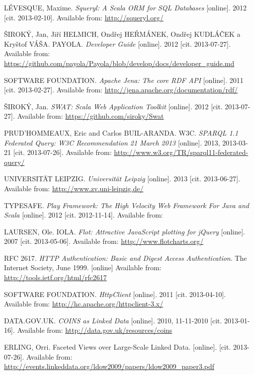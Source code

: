 \begin{thebibliography}{99}
{\sc LÉVESQUE,} Maxime. 
\emph{Squeryl: A Scala ORM for SQL Databases} [online]. 2012 [cit. 2013-02-10].
Available from: \url{http://squeryl.org/}

{\sc ŠIROKÝ,} Jan, Jiří HELMICH, Ondřej HEŘMÁNEK, Ondřej KUDLÁČEK a Kryštof VÁŠA. PAYOLA.
\emph{Developer Guide} [online]. 2012 [cit. 2013-07-27]. 
Available from: \url{https://github.com/payola/Payola/blob/develop/docs/developer_guide.md}

{\scAPACHE SOFTWARE FOUNDATION.} 
\emph{Apache Jena: The core RDF API} [online]. 2011 [cit. 2013-02-27]. 
Available from: \url{http://jena.apache.org/documentation/rdf/}

{\sc ŠIROKÝ,} Jan. 
\emph{SWAT: Scala Web Application Toolkit} [online]. 2012 [cit. 2013-07-27].
Available from: \url{https://github.com/siroky/Swat}

{\sc PRUD'HOMMEAUX,} Eric and Carlos BUIL-ARANDA. W3C.
\emph{SPARQL 1.1 Federated Query: W3C Recommendation 21 March 2013} [online].
2013, 2013-03-21 [cit. 2013-07-26].
Available from: \url{http://www.w3.org/TR/sparql11-federated-query/}

{\sc UNIVERSITÄT LEIPZIG.} \emph{Universität Leipzig} [online]. 2013 [cit. 2013-06-27].
Available from: \url{http://www.zv.uni-leipzig.de/}

{\sc TYPESAFE.}
\emph{Play Framework: The High Velocity Web Framework For Java and Scala} [online].
2012 [cit. 2012-11-14]. 
Available from:  

{\sc LAURSEN,} Ole. IOLA. 
\emph{Flot: Attractive JavaScript plotting for jQuery} [online]. 2007 [cit. 2013-05-06].
Available from: \url{http://www.flotcharts.org/}

RFC 2617.
\emph{HTTP Authentication: Basic and Digest Access Authentication}.
The Internet Society, June 1999. [online]
Available from: \url{http://tools.ietf.org/html/rfc2617}

{\scAPACHE SOFTWARE FOUNDATION.}
\emph{HttpClient} [online]. 2011 [cit. 2013-04-10]. 
Available from: \url{http://hc.apache.org/httpclient-3.x/}

{\sc DATA.GOV.UK.}
\emph{COINS as Linked Data} [online]. 2010, 11-11-2010 [cit. 2013-01-16].
Available from: \url{http://data.gov.uk/resources/coins}

{\sc ERLING,} Orri.
Faceted Views over Large-Scale Linked Data.  [online]. [cit. 2013-07-26].
Available from: 
\url{http://events.linkeddata.org/ldow2009/papers/ldow2009_paper3.pdf}

\end{thebibliography}
